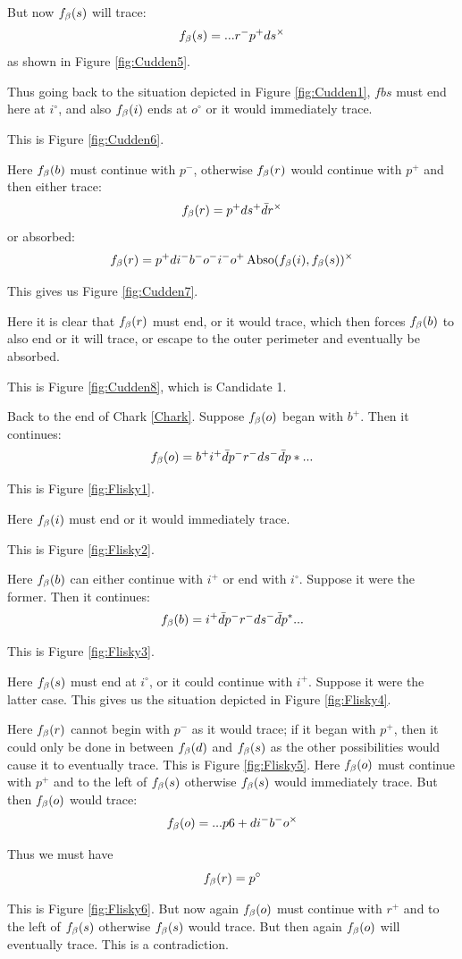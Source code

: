 But now $f_\beta(s)$ will trace:
\[
f_\beta(s) = ...r^- p^+ d s^\times
\]
as shown in Figure \ref{fig:Cudden5}.

Thus going back to the situation depicted in Figure \ref{fig:Cudden1}, $fbs$ must end here at $i^\circ$, and also $f_\beta(i)$ ends at $o^\circ$ or it would immediately trace. 

This is Figure \ref{fig:Cudden6}.

Here $f_\beta(b)$ must continue with $p^-$, otherwise $f_\beta(r)$ would continue with $p^+$ and then either trace:
\[
f_\beta(r) = p^+ d s^+ \bar{d} r^\times
\]
or absorbed:
\[
f_\beta(r) = p^+ d i^- b^- o^- i^- o^+ \operatorname{Abso}(f_\beta(i), f_\beta(s))^\times
\]

This gives us Figure \ref{fig:Cudden7}.

Here it is clear that $f_\beta(r)$ must end, or it would trace, which then forces $f_\beta(b)$ to also end or it will trace, or escape to the outer perimeter and eventually be absorbed.

This is Figure \ref{fig:Cudden8}, which is Candidate 1.

\label{Flisky}
Back to the end of Chark \ref{Chark}. Suppose $f_\beta(o)$ began with $b^+$. Then it continues:
\[
f_\beta(o) = b^+ i^+ \bar{d} p^- r^- d s^- \bar{d} p*...
\]

This is Figure \ref{fig:Flisky1}.

Here $f_\beta(i)$ must end or it would immediately trace. 

This is Figure \ref{fig:Flisky2}.

Here $f_\beta(b)$ can either continue with $i^+$ or end with $i^\circ$. Suppose it were the former. Then it continues:
\[
f_\beta(b) = i^+ \bar{d} p^- r^- d s^- \bar{d} p^*...
\]

This is Figure \ref{fig:Flisky3}.

Here $f_\beta(s)$ must end at $i^\circ$, or it could continue with $i^+$. Suppose it were the latter case. This gives us the situation depicted in Figure \ref{fig:Flisky4}.

Here $f_\beta(r)$ cannot begin with $p^-$ as it would trace; if it began with $p^+$, then it could only be done in between $f_\beta(d)$ and $f_\beta(s)$ as the other possibilities would cause it to eventually trace. This is Figure \ref{fig:Flisky5}. Here $f_\beta(o)$ must continue with $p^+$ and to the left of $f_\beta(s)$ otherwise $f_\beta(s)$ would immediately trace. But then $f_\beta(o)$ would trace:
\[
f_\beta(o) = ...p6+ d i^- b^- o^\times
\]

Thus we must have
\[
f_\beta(r) = p^\circ
\]

This is Figure \ref{fig:Flisky6}. But now again $f_\beta(o)$ must continue with $r^+$ and to the left of $f_\beta(s)$ otherwise $f_\beta(s)$ would trace. But then again $f_\beta(o)$ will eventually trace. This is a contradiction.


